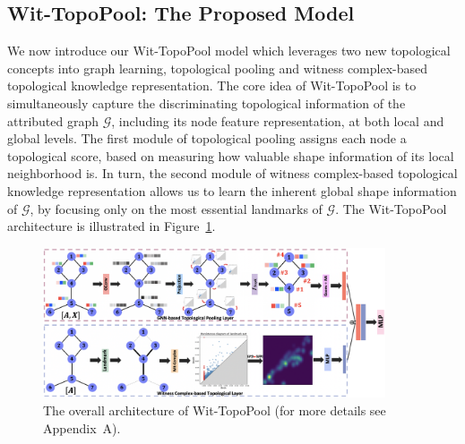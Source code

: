 \documentclass[letterpaper]{article} %
\begin{document}
\subsection{Wit-TopoPool: The Proposed Model}
We now introduce our Wit-TopoPool model which leverages two new topological concepts into graph learning, topological pooling and witness complex-based topological knowledge representation. The core idea of Wit-TopoPool is to simultaneously capture the discriminating topological information of the attributed graph $\mathcal{G}$, including its node feature representation, at both local and global levels. The first module of topological pooling assigns each node a topological score, based on measuring how valuable shape information of its local neighborhood is. In turn, the second module
of witness complex-based topological knowledge representation allows us to learn the inherent global shape information of $\mathcal{G}$, by focusing only on the most essential landmarks of $\mathcal{G}$. The Wit-TopoPool architecture is illustrated in Figure~\ref{flowchart}.
\begin{figure}[t!]
    \centering
    \includegraphics[width=0.9\textwidth]{Figures/Wit_TopoPool_updated_flowchart_v2.png}
    \caption{The overall architecture of Wit-TopoPool  (for more details see Appendix~A).\label{flowchart}}
\end{figure}
\end{document}
